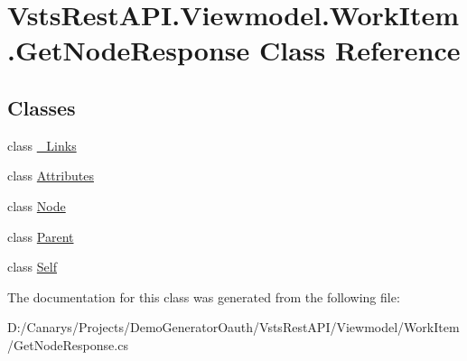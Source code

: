 \hypertarget{class_vsts_rest_a_p_i_1_1_viewmodel_1_1_work_item_1_1_get_node_response}{}\section{Vsts\+Rest\+A\+P\+I.\+Viewmodel.\+Work\+Item.\+Get\+Node\+Response Class Reference}
\label{class_vsts_rest_a_p_i_1_1_viewmodel_1_1_work_item_1_1_get_node_response}
\subsection*{Classes}
\begin{DoxyCompactItemize}
\item 
class \mbox{\hyperlink{class_vsts_rest_a_p_i_1_1_viewmodel_1_1_work_item_1_1_get_node_response_1_1___links}{\+\_\+\+Links}}
\item 
class \mbox{\hyperlink{class_vsts_rest_a_p_i_1_1_viewmodel_1_1_work_item_1_1_get_node_response_1_1_attributes}{Attributes}}
\item 
class \mbox{\hyperlink{class_vsts_rest_a_p_i_1_1_viewmodel_1_1_work_item_1_1_get_node_response_1_1_node}{Node}}
\item 
class \mbox{\hyperlink{class_vsts_rest_a_p_i_1_1_viewmodel_1_1_work_item_1_1_get_node_response_1_1_parent}{Parent}}
\item 
class \mbox{\hyperlink{class_vsts_rest_a_p_i_1_1_viewmodel_1_1_work_item_1_1_get_node_response_1_1_self}{Self}}
\end{DoxyCompactItemize}


The documentation for this class was generated from the following file\+:\begin{DoxyCompactItemize}
\item 
D\+:/\+Canarys/\+Projects/\+Demo\+Generator\+Oauth/\+Vsts\+Rest\+A\+P\+I/\+Viewmodel/\+Work\+Item/Get\+Node\+Response.\+cs\end{DoxyCompactItemize}
